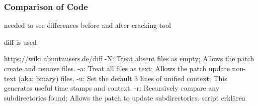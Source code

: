 \subsubsection{Comparison of Code}\label{subsection:tools-diff}
needed to see differences before and after cracking tool\newline

diff is used\newline

https://wiki.ubuntuusers.de/diff\newline
-N: Treat absent files as empty; Allows the patch create and remove files.\newline
-a: Treat all files as text; Allows the patch update non-text (aka: binary) files.\newline
-u: Set the default 3 lines of unified context; This generates useful time stamps and context.\newline
-r: Recursively compare any subdirectories found; Allows the patch to update subdirectories.\newline
script erklären\newline
